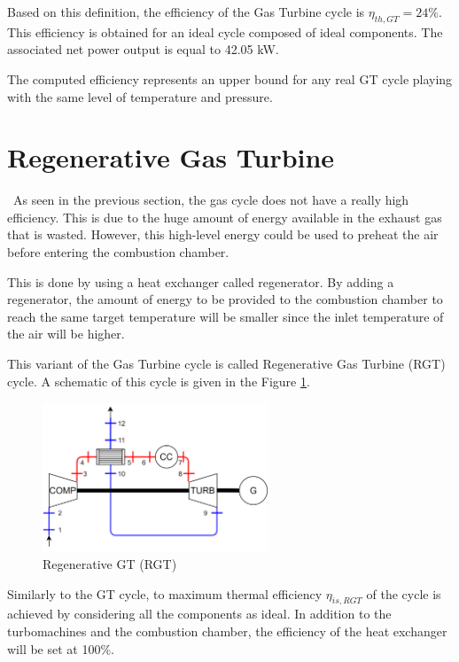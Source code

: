 Based on this definition, the efficiency of the Gas Turbine cycle is $\eta_{th,GT} =24$\%. This efficiency is obtained for an ideal cycle composed of ideal components. The associated net power output is equal to 42.05 kW. 

The computed efficiency represents an upper bound for any real GT cycle playing with the same level of temperature and pressure.

\section{Regenerative Gas Turbine}
\quad\, As seen in the previous section, the gas cycle does not have a really high efficiency. This is due to the huge amount of energy available in the exhaust gas that is wasted. However, this high-level energy could be used to preheat the air before entering the combustion chamber. 

This is done by using a heat exchanger called regenerator. By adding a regenerator, the amount of energy to be provided to the combustion chamber to reach the same target temperature will be smaller since the inlet temperature of the air will be higher.

This variant of the Gas Turbine cycle is called Regenerative Gas Turbine (RGT) cycle. A schematic of this cycle is given in the Figure \ref{fig:C5_RGT}.

\begin{figure}[h]
\centering
\includegraphics[width=0.6\textwidth]{RGT}
\caption{Regenerative GT (RGT)}
\label{fig:C5_RGT}
\end{figure}

Similarly to the GT cycle, to maximum thermal efficiency $\eta_{is,RGT}$ of the cycle is achieved by considering all the components as ideal. In addition to the turbomachines and the combustion chamber, the efficiency of the heat exchanger will be set at 100\%. 

